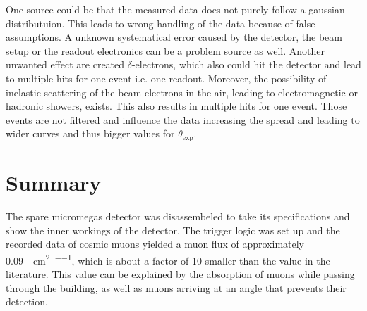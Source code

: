 \documentclass[sn-mathphys-num,iicol]{sn-jnl}
\theoremstyle{thmstyleone}
\theoremstyle{thmstyletwo}
\theoremstyle{thmstylethree}
\begin{document}
One source could be that the measured data does not purely follow a gaussian distributuion. 
This leads to wrong handling of the data because of false assumptions.
A unknown systematical error caused by the detector, the beam setup or the readout electronics can be a problem source as well. 
Another unwanted effect are created $\delta$-electrons, which also could hit the detector and lead to multiple hits for one event i.e. one readout.
Moreover, the possibility of inelastic scattering of the beam electrons in the air, leading to electromagnetic or hadronic showers, exists.
This also results in multiple hits for one event.
Those events are not filtered and influence the data increasing the spread and leading to wider curves and thus bigger values for $\theta_{\text{exp}}$.


\section{Summary}
The spare micromegas detector was disassembeled to take its specifications and show the inner workings of the detector.
The trigger logic was set up and the recorded data of cosmic muons yielded a muon flux of approximately \SI{0.09}{\per\centi\meter\squared\per\min}, which is about a factor of 10 smaller than the value in the literature. 
This value can be explained by the absorption of muons while passing through the building, as well as muons arriving at an angle that prevents their detection.
\end{document}
